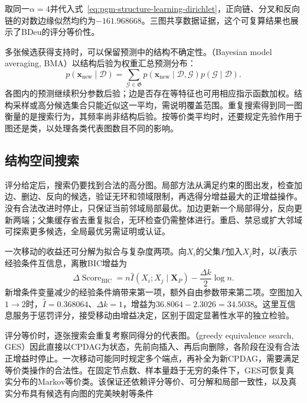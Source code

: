 取同一$\alpha=4$并代入式~\eqref{eq:pgm-structure-learning-dirichlet}，正向链、分叉和反向链的对数边缘似然均约为$-161.968668$。三图共享数据证据，这个可复算结果也展示了BDeu的评分等价性。

多张候选获得支持时，可以保留预测中的结构不确定性。（Bayesian model averaging, BMA）以结构后验为权重汇总预测分布：
\[
  p(\bm{x}_{\mathrm{new}}\mid\mathcal{D})
  =\sum_{\mathcal{G}\in\mathfrak{G}}
    p(\bm{x}_{\mathrm{new}}\mid\mathcal{D},\mathcal{G})
    p(\mathcal{G}\mid\mathcal{D}).
\]
各图内的预测继续积分参数后验；边是否存在等特征也可用相应指示函数加权。结构采样或高分候选集合只能近似这一平均，需说明覆盖范围。重复搜索得到同一图衡量的是搜索行为，其频率尚非结构后验。按等价类平均时，还要规定先验作用于图还是类，以处理各类代表图数目不同的影响。

\subsection{结构空间搜索}
\label{sec:pgm-structure-learning-search}

评分给定后，搜索仍要找到合法的高分图。局部方法从满足约束的图出发，检查加边、删边、反向的候选，验证无环和领域限制，再选得分增益最大的正增益操作。没有合法改进时停止，只保证当前邻域局部最优。加边更新一个局部得分，反向更新两端；父集缓存省去重复拟合，无环检查仍需整体进行。重启、禁忌或扩大邻域可探索更多候选，全局最优另需证明或认证。

一次移动的收益还可分解为拟合与复杂度两项。向$X_i$的父集$P$加入$X_j$时，以$\widehat I$表示经验条件互信息，离散BIC增益为
\begin{equation}
  \Delta\operatorname{Score}_{\mathrm{BIC}}
  =n\widehat I(X_i;X_j\mid\bm{X}_P)
   -\frac{\Delta k}{2}\log n.
  \label{eq:pgm-structure-learning-score-gain}
\end{equation}
新增条件变量减少的经验条件熵带来第一项，额外自由参数带来第二项。空图加入$1\to2$时，$\widehat I=0.368064$、$\Delta k=1$，增益为$36.8064-2.3026=34.5038$。这里互信息服务于惩罚评分，接受移动由增益决定，区别于固定显著性水平的独立检验。

评分等价时，逐张搜索会重复考察同得分的代表图。（greedy equivalence search, GES）因此直接以CPDAG为状态，先前向插入、再后向删除，各阶段在没有合法正增益时停止。一次移动可能同时规定多个端点，再补全为新CPDAG，需要满足等价类操作的合法性。在固定节点数、样本量趋于无穷的条件下，GES可恢复真实分布的Markov等价类。该保证还依赖评分等价、可分解和局部一致性，以及真实分布具有候选有向图的完美映射等条件


